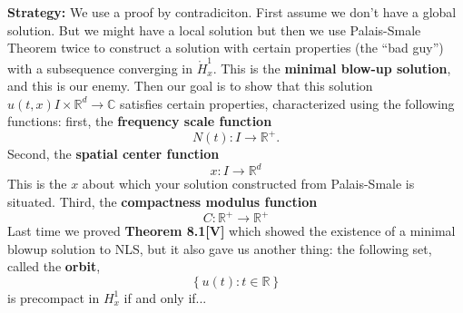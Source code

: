 \documentclass{article}
\def\R{\mathbb{R}} %
\begin{document}
\textbf{Strategy:} We use a proof by contradiciton. First assume we don't have a
global solution. But we might have a local solution but then we use Palais-Smale
Theorem twice to construct a solution with certain properties (the ``bad guy'')
with a subsequence converging in $\mathring{H}^{1}_{x}$. This is the
\textbf{minimal blow-up solution}, and this is our enemy. Then our goal is to
show that this solution $u(t,x)I \times \R^d \to \mathbb{C}$ satisfies certain
properties, characterized using the following functions:
first, the \textbf{frequency scale function} 
\begin{equation*}
  N(t): I \to \R^{+}.
\end{equation*}
Second, the \textbf{spatial center function}
\begin{equation*}
  x:I \to \R^d 
\end{equation*}
This is the $x$ about which your solution constructed from Palais-Smale is
situated. Third, the \textbf{compactness modulus function}
\begin{equation*}
  C:\R^{+}\to \R^{+}
\end{equation*}
Last time we proved \textbf{Theorem 8.1[V]} which showed the existence of a minimal
blowup solution to NLS, but it also gave us another thing: the following set,
called the \textbf{orbit}, 
\begin{equation*}
  \left\{ u(t):t\in \R \right\}
\end{equation*}
is precompact in $H^{1}_{x}$ if and only if...
\end{document}
